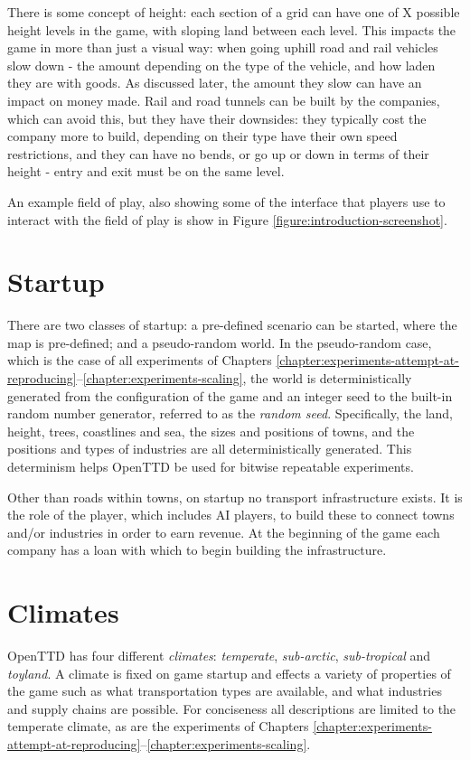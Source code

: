 \documentclass[logo,msc,dsti]{style/infthesis}    %
\begin{document}
{There is some concept of height: each section of a grid can have one of X possible height levels in the game, with sloping land between each level. This impacts the game in more than just a visual way: when going uphill road and rail vehicles slow down - the amount depending on the type of the vehicle, and how laden they are with goods. As discussed later, the amount they slow can have an impact on money made. Rail and road tunnels can be built by the companies, which can avoid this, but they have their downsides: they typically cost the company more to build, depending on their type have their own speed restrictions, and they can have no bends, or go up or down in terms of their height - entry and exit must be on the same level.

An example field of play, also showing some of the interface that players use to interact with the field of play is show in Figure \ref{figure:introduction-screenshot}.

\section{Startup}

There are two classes of startup: a pre-defined scenario can be started, where the map is pre-defined; and a pseudo-random world. In the pseudo-random case, which is the case of all experiments of Chapters \ref{chapter:experiments-attempt-at-reproducing}--\ref{chapter:experiments-scaling}, the world is deterministically generated from  the configuration of the game and an integer seed to the built-in random number generator, referred to as the \emph{random seed}. Specifically, the land, height, trees, coastlines and sea, the sizes and positions of towns, and the positions and types of industries are all deterministically generated. This determinism helps OpenTTD be used for bitwise repeatable experiments.

Other than roads within towns, on startup no transport infrastructure exists. It is the role of the player, which includes AI players, to build these to connect towns and/or industries in order to earn revenue. At the beginning of the game each company has a loan with which to begin building the infrastructure.

\section{Climates}

OpenTTD has four different \emph{climates}: \emph{temperate}, \emph{sub-arctic}, \emph{sub-tropical} and \emph{toyland}. A climate is fixed on game startup and effects a variety of properties of the game such as what transportation types are available, and what industries and supply chains are possible. For conciseness all descriptions are limited to the temperate climate, as are the experiments of Chapters \ref{chapter:experiments-attempt-at-reproducing}--\ref{chapter:experiments-scaling}.

}
\end{document}
